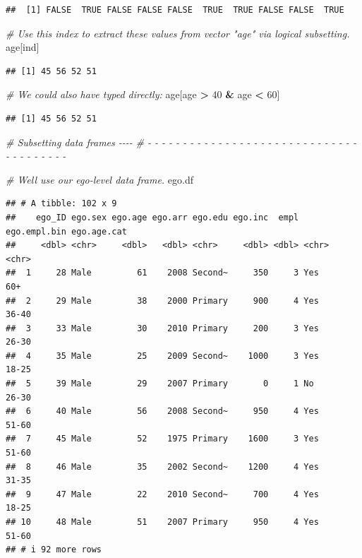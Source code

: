 \documentclass[
]{book}
\newenvironment{Shaded}{\begin{snugshade}}{\end{snugshade}}
\newcommand{\CommentTok}[1]{\textcolor[rgb]{0.56,0.35,0.01}{\textit{#1}}}
\newcommand{\DecValTok}[1]{\textcolor[rgb]{0.00,0.00,0.81}{#1}}
\newcommand{\NormalTok}[1]{#1}
\newcommand{\SpecialCharTok}[1]{\textcolor[rgb]{0.81,0.36,0.00}{\textbf{#1}}}
\begin{document}
\begin{verbatim}
##  [1] FALSE  TRUE FALSE FALSE FALSE  TRUE  TRUE FALSE FALSE  TRUE
\end{verbatim}

\begin{Shaded}
\begin{Highlighting}[]
\CommentTok{\# Use this index to extract these values from vector "age" via logical subsetting.}
\NormalTok{age[ind]}
\end{Highlighting}
\end{Shaded}

\begin{verbatim}
## [1] 45 56 52 51
\end{verbatim}

\begin{Shaded}
\begin{Highlighting}[]
\CommentTok{\# We could also have typed directly:}
\NormalTok{age[age }\SpecialCharTok{\textgreater{}} \DecValTok{40} \SpecialCharTok{\&}\NormalTok{ age }\SpecialCharTok{\textless{}} \DecValTok{60}\NormalTok{]}
\end{Highlighting}
\end{Shaded}

\begin{verbatim}
## [1] 45 56 52 51
\end{verbatim}

\begin{Shaded}
\begin{Highlighting}[]
\CommentTok{\# Subsetting data frames                                                     {-}{-}{-}{-} }
\CommentTok{\# {-} {-} {-} {-} {-} {-} {-} {-} {-} {-} {-} {-} {-} {-} {-} {-} {-} {-} {-} {-} {-} {-} {-} {-} {-} {-} {-} {-} {-} {-} {-} {-} {-} {-} {-} {-} {-} {-} {-} }

\CommentTok{\# We\textquotesingle{}ll use our ego{-}level data frame.}
\NormalTok{ego.df}
\end{Highlighting}
\end{Shaded}

\begin{verbatim}
## # A tibble: 102 x 9
##    ego_ID ego.sex ego.age ego.arr ego.edu ego.inc  empl ego.empl.bin ego.age.cat
##     <dbl> <chr>     <dbl>   <dbl> <chr>     <dbl> <dbl> <chr>        <chr>      
##  1     28 Male         61    2008 Second~     350     3 Yes          60+        
##  2     29 Male         38    2000 Primary     900     4 Yes          36-40      
##  3     33 Male         30    2010 Primary     200     3 Yes          26-30      
##  4     35 Male         25    2009 Second~    1000     3 Yes          18-25      
##  5     39 Male         29    2007 Primary       0     1 No           26-30      
##  6     40 Male         56    2008 Second~     950     4 Yes          51-60      
##  7     45 Male         52    1975 Primary    1600     3 Yes          51-60      
##  8     46 Male         35    2002 Second~    1200     4 Yes          31-35      
##  9     47 Male         22    2010 Second~     700     4 Yes          18-25      
## 10     48 Male         51    2007 Primary     950     4 Yes          51-60      
## # i 92 more rows
\end{verbatim}
\end{document}
